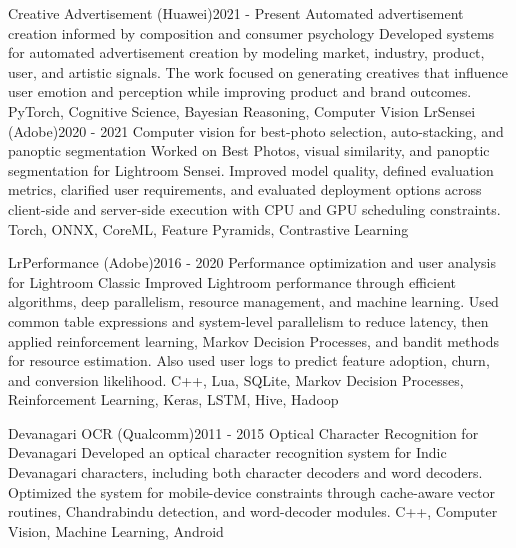
\begin{projects}
	\project
	{Creative Advertisement (Huawei)}{2021 - Present}
	{Automated advertisement creation informed by composition and consumer psychology}
	{Developed systems for automated advertisement creation by modeling market, industry, product, user, and artistic signals. The work focused on generating creatives that influence user emotion and perception while improving product and brand outcomes.}
	{PyTorch, Cognitive Science, Bayesian Reasoning, Computer Vision}
	\project
	{LrSensei (Adobe)}{2020 - 2021}
	{Computer vision for best-photo selection, auto-stacking, and panoptic segmentation}
	{Worked on Best Photos, visual similarity, and panoptic segmentation for Lightroom Sensei. Improved model quality, defined evaluation metrics, clarified user requirements, and evaluated deployment options across client-side and server-side execution with CPU and GPU scheduling constraints.}
	{Torch, ONNX, CoreML, Feature Pyramids, Contrastive Learning}
				
	\project
	{LrPerformance (Adobe)}{2016 - 2020}
	{Performance optimization and user analysis for Lightroom Classic}
	{Improved Lightroom performance through efficient algorithms, deep parallelism, resource management, and machine learning. Used common table expressions and system-level parallelism to reduce latency, then applied reinforcement learning, Markov Decision Processes, and bandit methods for resource estimation. Also used user logs to predict feature adoption, churn, and conversion likelihood.}
	{C++, Lua, SQLite, Markov Decision Processes, Reinforcement Learning, Keras, LSTM, Hive, Hadoop}
	
	\project
	{Devanagari OCR (Qualcomm)}{2011 - 2015}
	{Optical Character Recognition for Devanagari}
	{Developed an optical character recognition system for Indic Devanagari characters, including both character decoders and word decoders. Optimized the system for mobile-device constraints through cache-aware vector routines, Chandrabindu detection, and word-decoder modules.}
	{C++, Computer Vision, Machine Learning, Android}	

\end{projects}
